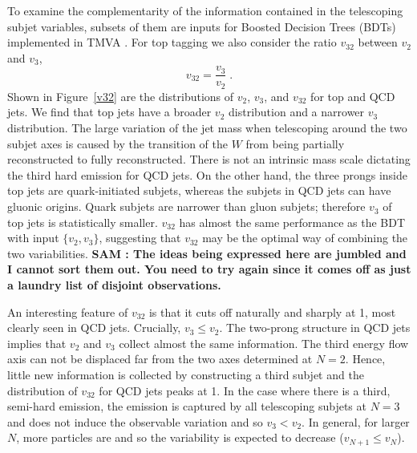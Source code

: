 \documentclass[aps,prl,floatfix,preprintnumbers,twocolumn,groupedaddress,nofootinbib]{revtex4-1}
\newcommand{\be}{\begin{equation}}
\newcommand{\ee}{\end{equation}}
\begin{document}
To examine the complementarity of the information contained in the telescoping subjet variables, subsets of them are inputs for Boosted Decision Trees (BDTs) implemented in \textsc{TMVA} \cite{Hocker:2007ht}. For top tagging we also consider the ratio $v_{32}$ between $v_2$ and $v_3$,
\be
    v_{32}=\frac{v_3}{v_2}\;.
\ee
Shown in Figure~\ref{v32} are the distributions of $v_2$, $v_3$, and $v_{32}$ for top and QCD jets. We find that top jets have a broader $v_2$ distribution and a narrower $v_3$ distribution. The large variation of the jet mass when telescoping around the two subjet axes is caused by the transition of the $W$ from being partially reconstructed to fully reconstructed. There is not an intrinsic mass scale dictating the third hard emission for QCD jets. On the other hand, the three prongs inside top jets are quark-initiated subjets, whereas the subjets in QCD jets can have gluonic origins. Quark subjets are narrower than gluon subjets; therefore $v_3$ of top jets is statistically smaller. $v_{32}$ has almost the same performance as the BDT with input $\{v_2,v_3\}$, suggesting that $v_{32}$ may be the optimal way of combining the two variabilities. \textbf{\color{blue} SAM : The ideas being expressed here are jumbled and I cannot sort them out.  You need to try again since it comes off as just a laundry list of disjoint observations.}

An interesting feature of $v_{32}$ is that it cuts off naturally and sharply at 1, most clearly seen in QCD jets. Crucially, $v_{3} \leq v_{2}$. The two-prong structure in QCD jets implies that $v_{2}$ and $v_{3}$ collect almost the same information. The third energy flow axis can not be displaced far from the two axes determined at $N=2$. Hence, little new information is collected by constructing a third subjet and the distribution of $v_{32}$ for QCD jets peaks at 1. In the case where there is a third, semi-hard emission, the emission is captured by all telescoping subjets at $N=3$ and does not induce the observable variation and so $v_{3} < v_{2}$. In general, for larger $N$, more particles are and so the variability is expected to decrease ($v_{N+1}\leq v_{N}$).
\end{document}
